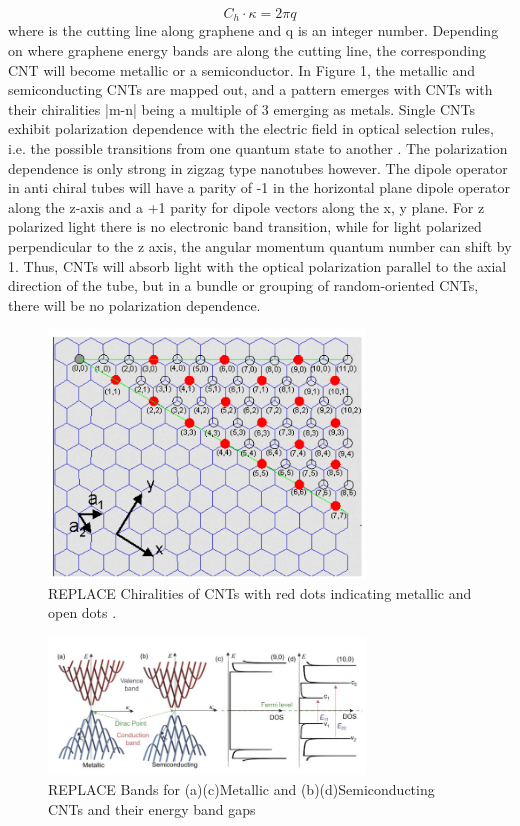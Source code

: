 \begin{equation}
	C_h\cdot\kappa = 2\pi q
\end{equation}
where  is the cutting line along graphene and q is an integer number.
Depending on where graphene energy bands are along the cutting line, the corresponding CNT will become metallic or a semiconductor. In Figure 1, the metallic and semiconducting CNTs are mapped out, and a pattern emerges with CNTs with their chiralities |m-n| being a multiple of 3 emerging as metals.
Single CNTs exhibit polarization dependence with the electric field in optical selection rules, i.e. the possible transitions from one quantum state to another \cite{thomsen}. The polarization dependence is only strong in zigzag type nanotubes however. The dipole operator in anti chiral tubes will have a parity of -1 in the horizontal plane dipole operator along the z-axis and a +1 parity for dipole vectors along the x, y plane. For z polarized light there is no electronic band transition, while for light polarized perpendicular to the z axis, the angular momentum quantum number can shift by 1. Thus, CNTs will absorb light with the optical polarization parallel to the axial direction of the tube, but in a bundle or grouping of random-oriented CNTs, there will be no polarization dependence.

\begin{figure}[h]
	\centering
	\includegraphics[width=0.75\textwidth]{./Figures/CNTs/chiral.png}
	\caption{REPLACE Chiralities of CNTs with red dots indicating metallic and open dots  \cite{dresselhaus}. }
	\label{fig:chiralities}
\end{figure}
\clearpage

\begin{figure}[h]
	\centering
	\includegraphics[width=0.75\textwidth]{./Figures/CNTs/DOS.png}
	\caption { REPLACE Bands for (a)(c)Metallic and (b)(d)Semiconducting CNTs and their energy band gaps \cite{yamashita}}
	\label{fig:cnt dos}
\end{figure}
\clearpage

